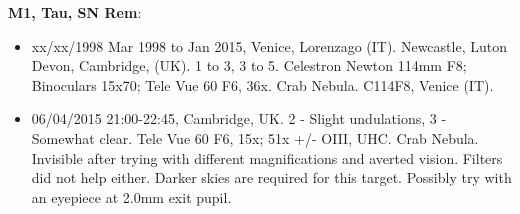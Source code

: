 {\bf M1, Tau, SN Rem}:
\begin{itemize}
\item xx/xx/1998 Mar 1998 to Jan 2015, Venice, Lorenzago (IT). Newcastle, Luton Devon, Cambridge, (UK). 1 to 3, 3 to 5. Celestron Newton 114mm F8; Binoculars 15x70; Tele Vue 60 F6, 36x. Crab Nebula. C114F8, Venice (IT).
\item 06/04/2015 21:00-22:45, Cambridge, UK. 2 - Slight undulations, 3 - Somewhat clear. Tele Vue 60 F6, 15x; 51x +/- OIII, UHC. Crab Nebula. Invisible after trying with different magnifications and averted vision. Filters did not help either. Darker skies are required for this target. Possibly try with an eyepiece at 2.0mm exit pupil.
\end{itemize}

